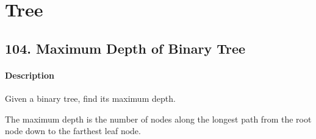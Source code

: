\section{Tree}

\subsection{104. Maximum Depth of Binary Tree}

\paragraph{Description}

Given a binary tree, find its maximum depth.

The maximum depth is the number of nodes along the longest path from the root node down to the farthest leaf node.